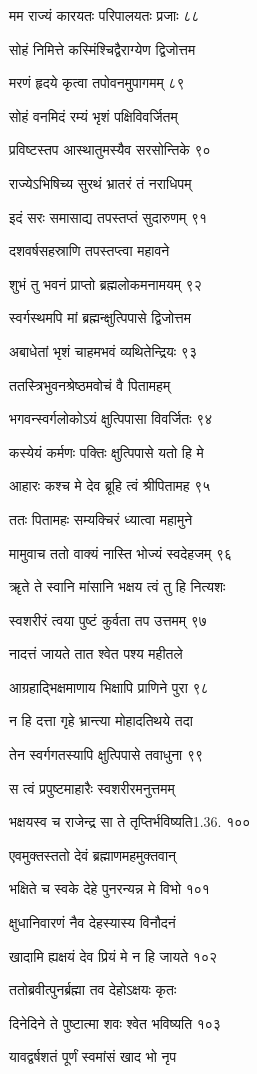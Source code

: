मम राज्यं कारयतः परिपालयतः प्रजाः ८८

सोहं निमित्ते कस्मिंश्चिद्वैराग्येण द्विजोत्तम

मरणं हृदये कृत्वा तपोवनमुपागमम् ८९

सोहं वनमिदं रम्यं भृशं पक्षिविवर्जितम्

प्रविष्टस्तप आस्थातुमस्यैव सरसोन्तिके ९०

राज्येऽभिषिच्य सुरथं भ्रातरं तं नराधिपम्

इदं सरः समासाद्य तपस्तप्तं सुदारुणम् ९१

दशवर्षसहस्राणि तपस्तप्त्वा महावने

शुभं तु भवनं प्राप्तो ब्रह्मलोकमनामयम् ९२

स्वर्गस्थमपि मां ब्रह्मन्क्षुत्पिपासे द्विजोत्तम

अबाधेतां भृशं चाहमभवं व्यथितेन्द्रियः ९३

ततस्त्रिभुवनश्रेष्ठमवोचं वै पितामहम्

भगवन्स्वर्गलोकोऽयं क्षुत्पिपासा विवर्जितः ९४

कस्येयं कर्मणः पक्तिः क्षुत्पिपासे यतो हि मे

आहारः कश्च मे देव ब्रूहि त्वं श्रीपितामह ९५

ततः पितामहः सम्यक्चिरं ध्यात्वा महामुने

मामुवाच ततो वाक्यं नास्ति भोज्यं स्वदेहजम् ९६

ॠते ते स्वानि मांसानि भक्षय त्वं तु हि नित्यशः

स्वशरीरं त्वया पुष्टं कुर्वता तप उत्तमम् ९७

नादत्तं जायते तात श्वेत पश्य महीतले

आग्रहाद्भिक्षमाणाय भिक्षापि प्राणिने पुरा ९८

न हि दत्ता गृहे भ्रान्त्या मोहादतिथये तदा

तेन स्वर्गगतस्यापि क्षुत्पिपासे तवाधुना ९९

स त्वं प्रपुष्टमाहारैः स्वशरीरमनुत्तमम्

भक्षयस्व च राजेन्द्र सा ते तृप्तिर्भविष्यति1.36. १००

एवमुक्तस्ततो देवं ब्रह्माणमहमुक्तवान्

भक्षिते च स्वके देहे पुनरन्यन्न मे विभो १०१

क्षुधानिवारणं नैव देहस्यास्य विनौदनं

खादामि ह्यक्षयं देव प्रियं मे न हि जायते १०२

ततोब्रवीत्पुनर्ब्रह्मा तव देहोऽक्षयः कृतः

दिनेदिने ते पुष्टात्मा शवः श्वेत भविष्यति १०३

यावद्वर्षशतं पूर्णं स्वमांसं खाद भो नृप

